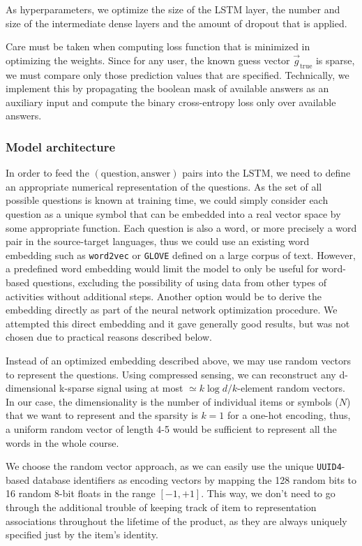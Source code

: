 As hyperparameters, we optimize the size of the LSTM layer, the number and size of the intermediate dense layers and the amount of dropout that is applied.

Care must be taken when computing loss function that is minimized in optimizing the weights. Since for any user, the known guess vector $\vec{g}_\mathrm{true}$ is sparse, we must compare only those prediction values that are specified. Technically, we implement this by propagating the boolean mask of available answers as an auxiliary input and compute the binary cross-entropy loss only over available answers.

\subsubsection{Model architecture}

In order to feed the $(\mathrm{question}, \mathrm{answer})$ pairs into the LSTM, we need to define an appropriate numerical representation of the questions. As the set of all possible questions is known at training time, we could simply consider each question as a unique symbol that can be embedded into a real vector space by some appropriate function. Each question is also a word, or more precisely a word pair in the source-target languages, thus we could use an existing word embedding such as \verb|word2vec|\cite{mikolov2013efficient} or \verb|GLOVE|\cite{pennington2014glove} defined on a large corpus of text. However, a predefined word embedding would limit the model to only be useful for word-based questions, excluding the possibility of using data from other types of activities without additional steps. Another option would be to derive the embedding directly as part of the neural network optimization procedure. We attempted this direct embedding and it gave generally good results, but was not chosen due to practical reasons described below.

Instead of an optimized embedding described above, we may use random vectors to represent the questions. Using compressed sensing, we can reconstruct any d-dimensional k-sparse signal using at most $\simeq k\log d/k$-element random vectors\cite{baraniuk2007compressive}. In our case, the dimensionality is the number of individual items or symbols ($N$) that we want to represent and the sparsity is $k=1$ for a one-hot encoding, thus, a uniform random vector of length 4-5 would be sufficient to represent all the words in the whole course.

We choose the random vector approach, as we can easily use the unique \verb|UUID4|-based database identifiers as encoding vectors by mapping the 128 random bits to 16 random 8-bit floats in the range $[-1, +1]$. This way, we don't need to go through the additional trouble of keeping track of item to representation associations throughout the lifetime of the product, as they are always uniquely specified just by the item's identity.


